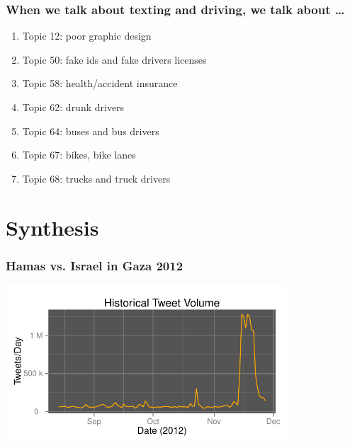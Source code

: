 \documentclass{beamer}
\begin{document}
\begin{frame}\frametitle{When we talk about texting and driving, we talk about \ldots}
\begin{center}
{\Large 
\begin{enumerate}
\item Topic 12: poor graphic design
\item Topic 50: fake ids and fake drivers licenses
\item Topic 58: health/accident insurance
\item Topic 62: drunk drivers
\item Topic 64: buses and bus drivers
\item Topic 67: bikes, bike lanes
\item Topic 68: trucks and truck drivers
\end{enumerate}
}
\end{center}
\end{frame}


\section{Synthesis}
{
\begin{frame}
\textcolor{black} {
\hfill \Huge \insertsection}
\end{frame}
}

\begin{frame}\frametitle{Hamas vs. Israel in Gaza 2012}
  \begin{center}
    \includegraphics[width=10.5cm]{./imgs/HI_minimal-all-daily.pdf}
  \end{center}
\end{frame}
\end{document}
